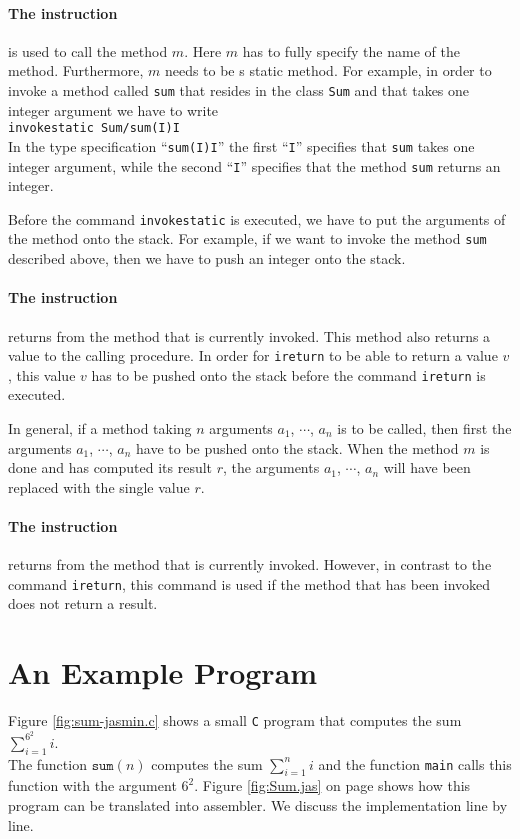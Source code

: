 \paragraph{The instruction }
is used to call the method $m$.  Here $m$ has to fully specify the name of the method.
Furthermore, $m$ needs to be s static method.
For example, in order to invoke a  method called \texttt{sum} that resides in the class \texttt{Sum}
and that takes one integer argument we have to write 
\\[0.2cm]
\hspace*{1.3cm}
\texttt{invokestatic  Sum/sum(I)I}
\\[0.2cm]
In the type specification ``\texttt{sum(I)I}'' the first ``\texttt{I}'' specifies that \texttt{sum}
takes one integer argument, while the second ``\texttt{I}'' specifies that the method \texttt{sum}
returns an integer.

Before the command \texttt{invokestatic} is executed, we have to put the arguments of the method
onto the stack.  For example, if we want to invoke the method \texttt{sum} described  above, then we
have to push an integer onto the stack.


\paragraph{The instruction }
returns from the method that is currently invoked.  This method also returns a value to the calling
procedure.  In order for \texttt{ireturn} to be able to return a value $v$, this value $v$ has to be
pushed onto the stack before the command \texttt{ireturn} is executed.

In general, if a method taking $n$ arguments $a_1$, $\cdots$, $a_n$ is to be called, then first the
arguments $a_1$, $\cdots$, $a_n$ have to be pushed onto the stack.  When the method $m$ is done and
has computed its result $r$, the arguments $a_1$, $\cdots$, $a_n$ will have been replaced with the
single value $r$.

\paragraph{The instruction }
returns from the method that is currently invoked.  However, in contrast to the command
\texttt{ireturn}, this command is used if the method that has been invoked  does not return a result. 

\section{An Example Program}
Figure \ref{fig:sum-jasmin.c} shows a small \texttt{C} program that computes the sum
\\[0.2cm]
\hspace*{1.3cm}
$\sum\limits_{i=1}^{6^2} i$.
\\[0.2cm]
The function $\mathtt{sum}(n)$ computes the sum $\sum_{i=1}^{n} i$ and the function
\texttt{main} calls this function with the argument $6^2$.  Figure \ref{fig:Sum.jas} on page
\pageref{fig:Sum.jas} shows how this program can be translated 
into assembler.  We discuss the implementation line by line.


